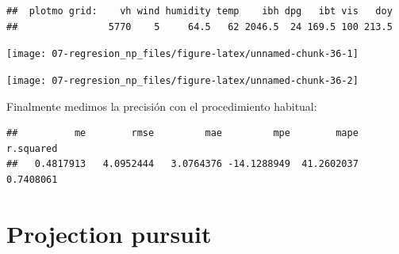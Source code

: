 \documentclass[
]{book}
\newenvironment{Shaded}{\begin{snugshade}}{\end{snugshade}}
\newcommand{\AttributeTok}[1]{\textcolor[rgb]{0.77,0.63,0.00}{#1}}
\newcommand{\DecValTok}[1]{\textcolor[rgb]{0.00,0.00,0.81}{#1}}
\newcommand{\FunctionTok}[1]{\textcolor[rgb]{0.00,0.00,0.00}{#1}}
\newcommand{\NormalTok}[1]{#1}
\newcommand{\OtherTok}[1]{\textcolor[rgb]{0.56,0.35,0.01}{#1}}
\newcommand{\SpecialCharTok}[1]{\textcolor[rgb]{0.00,0.00,0.00}{#1}}
\newcommand{\StringTok}[1]{\textcolor[rgb]{0.31,0.60,0.02}{#1}}
\theoremstyle{break}
\theoremstyle{definition}
\theoremstyle{definition}
\theoremstyle{definition}
\theoremstyle{definition}
\theoremstyle{remark}
\begin{document}
\begin{verbatim}
##  plotmo grid:    vh wind humidity temp    ibh dpg   ibt vis   doy
##                5770    5     64.5   62 2046.5  24 169.5 100 213.5
\end{verbatim}

\begin{center}\texttt{[image: 07-regresion\_np\_files/figure-latex/unnamed-chunk-36-1]} \end{center}

\begin{Shaded}
\end{Shaded}

\begin{center}\texttt{[image: 07-regresion\_np\_files/figure-latex/unnamed-chunk-36-2]} \end{center}

Finalmente medimos la precisión con el procedimiento habitual:

\begin{Shaded}
\end{Shaded}

\begin{verbatim}
##          me        rmse         mae         mpe        mape   r.squared 
##   0.4817913   4.0952444   3.0764376 -14.1288949  41.2602037   0.7408061
\end{verbatim}

\hypertarget{projection-pursuit}{%
\section{Projection pursuit}\label{projection-pursuit}}
\end{document}
